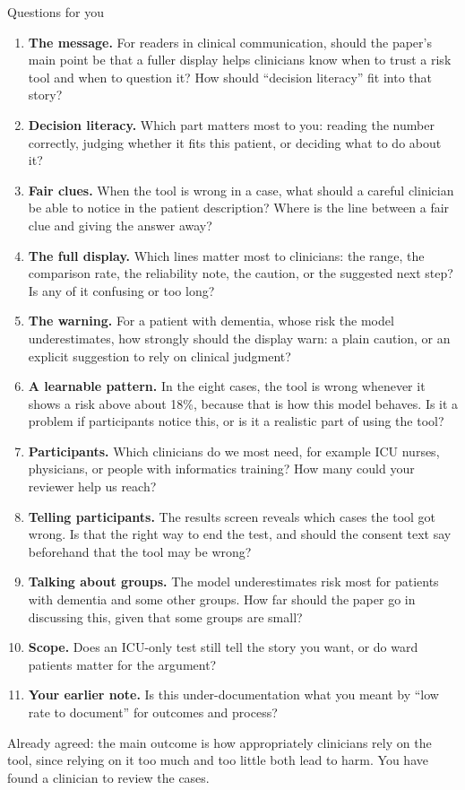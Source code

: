 \documentclass[11pt]{article}
\begin{document}
\begin{plainbox}{Questions for you}
\begin{enumerate}
	\item \textbf{The message.} For readers in clinical communication, should the paper's main point be that a fuller display helps clinicians know when to trust a risk tool and when to question it? How should ``decision literacy'' fit into that story?
	\item \textbf{Decision literacy.} Which part matters most to you: reading the number correctly, judging whether it fits this patient, or deciding what to do about it?
	\item \textbf{Fair clues.} When the tool is wrong in a case, what should a careful clinician be able to notice in the patient description? Where is the line between a fair clue and giving the answer away?
	\item \textbf{The full display.} Which lines matter most to clinicians: the range, the comparison rate, the reliability note, the caution, or the suggested next step? Is any of it confusing or too long?
	\item \textbf{The warning.} For a patient with dementia, whose risk the model underestimates, how strongly should the display warn: a plain caution, or an explicit suggestion to rely on clinical judgment?
	\item \textbf{A learnable pattern.} In the eight cases, the tool is wrong whenever it shows a risk above about 18\%, because that is how this model behaves. Is it a problem if participants notice this, or is it a realistic part of using the tool?
	\item \textbf{Participants.} Which clinicians do we most need, for example ICU nurses, physicians, or people with informatics training? How many could your reviewer help us reach?
	\item \textbf{Telling participants.} The results screen reveals which cases the tool got wrong. Is that the right way to end the test, and should the consent text say beforehand that the tool may be wrong?
	\item \textbf{Talking about groups.} The model underestimates risk most for patients with dementia and some other groups. How far should the paper go in discussing this, given that some groups are small?
	\item \textbf{Scope.} Does an ICU-only test still tell the story you want, or do ward patients matter for the argument?
	\item \textbf{Your earlier note.} Is this under-documentation what you meant by ``low rate to document'' for outcomes and process?
\end{enumerate}
{\small Already agreed: the main outcome is how appropriately clinicians rely on the tool, since relying on it too much and too little both lead to harm. You have found a clinician to review the cases.\par}
\end{plainbox}
\end{document}
